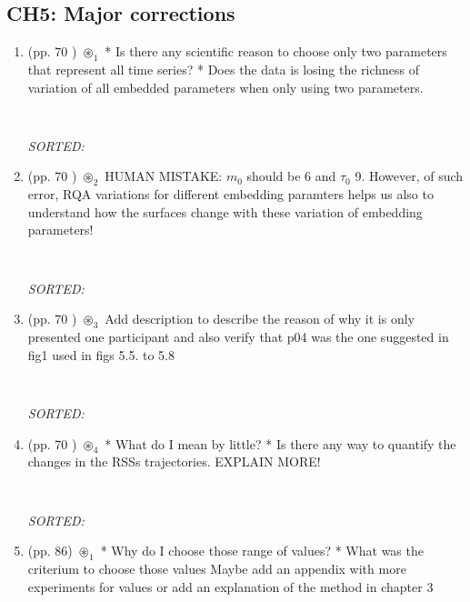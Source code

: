 \documentclass[12pt]{article}
\begin{document}
\subsection{CH5: Major corrections}
\begin{enumerate}

\item  (pp. 70 ) $\circledast_1$ 	
	* Is there any scientific reason to choose only
	two parameters that represent all time series?	
	* Does the data is losing the richness of 
	variation of all embedded parameters when only 
	using two parameters.
	\begin{verbatim}
	
	\end{verbatim}
	\textit{
	SORTED:  
	}
	\\

\item  (pp. 70 ) $\circledast_2$ 
	HUMAN MISTAKE:
	$m_0$ should be 6 and $\tau_0$ 9.
	However, of such error, RQA variations
	for different embedding paramters helps
	us also to understand how the surfaces
	change with these variation of embedding 
	parameters!
	\begin{verbatim}
	
	\end{verbatim}
	\textit{
	SORTED:  
	}
	\\

\item  (pp. 70 ) $\circledast_3$ 
	Add description to describe the reason
	of why it is only presented one participant
	and also verify that p04 was the one suggested
	in fig1 used in figs 5.5. to 5.8	
	\begin{verbatim}
	
	\end{verbatim}
	\textit{
	SORTED:  
	}
	\\




\item  (pp. 70 ) $\circledast_4$ 
	* What do I mean by little?
	* Is there any way to quantify the changes in the RSSs 
	trajectories. EXPLAIN MORE!	
	\begin{verbatim}
	
	\end{verbatim}
	\textit{
	SORTED:  
	}
	\\


\item  (pp. 86) $\circledast_1$ 
	* Why do I choose those range of values?
	* What was the criterium to choose those values
	Maybe add an appendix with more experiments for values
	or add an explanation of the method in chapter 3
	\begin{verbatim}
	

\end{verbatim}
\end{enumerate}
\end{document}
